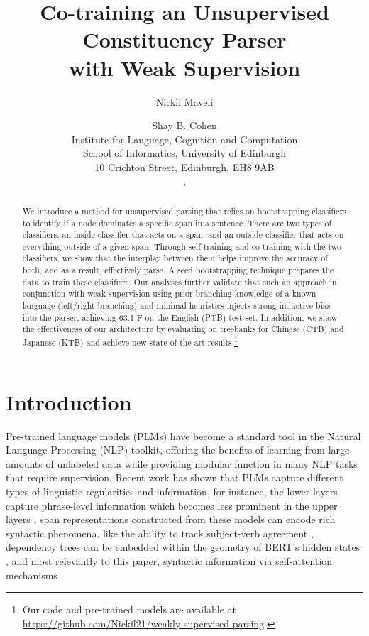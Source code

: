 \documentclass[11pt]{article}
\title{Co-training an Unsupervised Constituency Parser \\ with Weak Supervision}
\author{Nickil Maveli \and Shay B. Cohen \\
Institute for Language, Cognition and Computation \\
School of Informatics, University of Edinburgh \\
10 Crichton Street, Edinburgh, EH8 9AB \\
\eml{n.maveli@sms.ed.ac.uk},
\eml{scohen@inf.ed.ac.uk}}
\begin{document}
\maketitle
\begin{abstract}
We introduce a method for unsupervised parsing that relies on bootstrapping classifiers to identify if a node dominates a specific span in a sentence. There are two types of classifiers, an inside classifier that acts on a span, and an outside classifier that acts on everything outside of a given span. Through self-training and co-training with the two classifiers, we show that the interplay between them helps improve the accuracy of both, and as a result, effectively parse. A seed bootstrapping technique prepares the data to train these classifiers. Our analyses further validate that such an approach in conjunction with weak supervision using prior branching knowledge of a known language (left/right-branching) and minimal heuristics injects strong inductive bias into the parser, achieving 63.1 F on the English (PTB) test set. In addition, we show the effectiveness of our architecture by evaluating on treebanks for Chinese (CTB) and Japanese (KTB) and achieve new state-of-the-art results.\footnote{Our code and pre-trained models are available at\\
\url{https://github.com/Nickil21/weakly-supervised-parsing}.}
\end{abstract}


\section{Introduction}
\label{sec:intro}

Pre-trained language models (PLMs) have become a standard tool in the Natural Language Processing (NLP) toolkit, offering the benefits of learning from large amounts of unlabeled data while providing modular function in many NLP tasks that require supervision. Recent work has shown that PLMs capture different types of linguistic regularities and information, for instance, the lower layers capture phrase-level information which becomes less prominent in the upper layers \citep{jawahar-etal-2019-bert}, span representations constructed from these models can encode rich syntactic phenomena, like the ability to track subject-verb agreement \citep{Goldberg2019AssessingBS}, dependency trees can be embedded within the geometry of BERT's hidden states \citep{hewitt-manning-2019-structural}, and most relevantly to this paper, syntactic information via self-attention mechanisms \citep{wang-etal-2019-tree, Kim2020Are}. 
\end{document}
